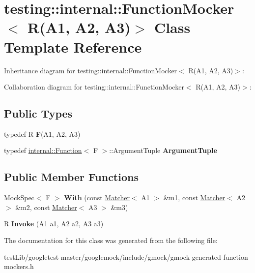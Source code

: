 \hypertarget{classtesting_1_1internal_1_1FunctionMocker_3_01R_07A1_00_01A2_00_01A3_08_4}{}\section{testing\+:\+:internal\+:\+:Function\+Mocker$<$ R(A1, A2, A3)$>$ Class Template Reference}
\label{classtesting_1_1internal_1_1FunctionMocker_3_01R_07A1_00_01A2_00_01A3_08_4}


Inheritance diagram for testing\+:\+:internal\+:\+:Function\+Mocker$<$ R(A1, A2, A3)$>$\+:


Collaboration diagram for testing\+:\+:internal\+:\+:Function\+Mocker$<$ R(A1, A2, A3)$>$\+:
\subsection*{Public Types}
\begin{DoxyCompactItemize}
\item 
\mbox{\label{classtesting_1_1internal_1_1FunctionMocker_3_01R_07A1_00_01A2_00_01A3_08_4_a8c471830f963b8012785eb3eeca2cc9c}} 
typedef R {\bfseries F}(A1, A2, A3)
\item 
\mbox{\label{classtesting_1_1internal_1_1FunctionMocker_3_01R_07A1_00_01A2_00_01A3_08_4_a347dcf4c054a5f1fbd0e2f0ad1c5e2f3}} 
typedef \hyperlink{structtesting_1_1internal_1_1Function}{internal\+::\+Function}$<$ F $>$\+::Argument\+Tuple {\bfseries Argument\+Tuple}
\end{DoxyCompactItemize}
\subsection*{Public Member Functions}
\begin{DoxyCompactItemize}
\item 
\mbox{\label{classtesting_1_1internal_1_1FunctionMocker_3_01R_07A1_00_01A2_00_01A3_08_4_a06fc66e2e75ff98d257966e7234bb833}} 
Mock\+Spec$<$ F $>$ {\bfseries With} (const \hyperlink{classtesting_1_1Matcher}{Matcher}$<$ A1 $>$ \&m1, const \hyperlink{classtesting_1_1Matcher}{Matcher}$<$ A2 $>$ \&m2, const \hyperlink{classtesting_1_1Matcher}{Matcher}$<$ A3 $>$ \&m3)
\item 
\mbox{\label{classtesting_1_1internal_1_1FunctionMocker_3_01R_07A1_00_01A2_00_01A3_08_4_a2afad9e39ca64acc6b178fa415907c5b}} 
R {\bfseries Invoke} (A1 a1, A2 a2, A3 a3)
\end{DoxyCompactItemize}


The documentation for this class was generated from the following file\+:\begin{DoxyCompactItemize}
\item 
test\+Lib/googletest-\/master/googlemock/include/gmock/gmock-\/generated-\/function-\/mockers.\+h\end{DoxyCompactItemize}
